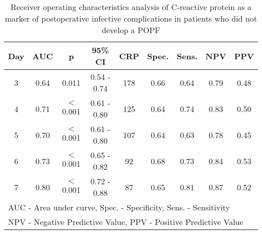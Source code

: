 \begin{table}[h]
	\centering
	\caption{Receiver operating characteristics analysis of C-reactive protein as a marker of postoperative infective complications in patients who did not develop a POPF}
	\label{table:crp_comp_ROC_infections_noPOPF}
	\renewcommand{\arraystretch}{1.4} %
	\begin{tabular}{| c | c c c | c c c c c |}
		\hline
		Day & AUC  & p        & 95\% CI     & CRP & Spec. & Sens. & NPV  & PPV               \\ \hline
		3   & 0.64 & 0.011    & 0.54 - 0.74 & 178 & 0.66  & 0.64  & 0.79 & 0.48              \\
		4   & 0.71 & $<$0.001 & 0.61 - 0.80 & 125 & 0.64  & 0.74  & 0.83 & 0.50              \\
		5   & 0.70 & $<$0.001 & 0.61 - 0.80 & 107 & 0.64  & 0.63  & 0.78 & 0.45              \\
		6   & 0.73 & $<$0.001 & 0.65 - 0.82 & 92  & 0.68  & 0.73  & 0.84 & 0.53              \\
		7   & 0.80 & $<$0.001 & 0.72 - 0.88 & 87  & 0.65  & 0.81  & 0.87 & 0.52              \\ \hline
		\multicolumn{9}{l}{AUC - Area under curve, Spec. - Specificity, Sens. - Sensitivity} \\
		\multicolumn{9}{l}{NPV - Negative Predictive Value, PPV - Positive Predictive Value}
	\end{tabular}
\end{table}